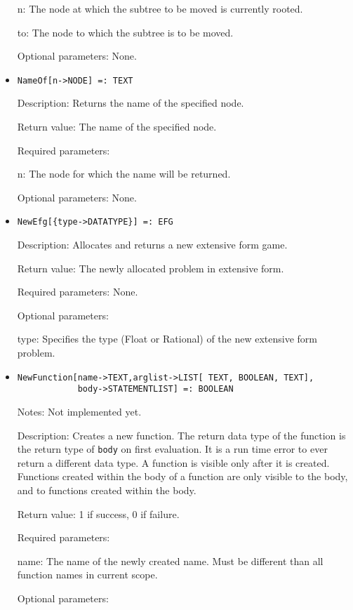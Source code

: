 \begin{itemize}
\bd
\item
[n:] The node at which the subtree to be moved is currently rooted.
\item
[to:] The node to which the subtree is to be moved.
\ed

\item
[Optional parameters:] None.
\ed

\item
\protect \large \begin{verbatim}
NameOf[n->NODE] =: TEXT
\end{verbatim}\normalsize

\bd
\item
[Description:] Returns the name of the specified node.
\item
[Return value:] The name of the specified node.
\item
[Required parameters:]\hfil\null

\bd
\item
[n:] The node for which the name will be returned.
\ed

\item
[Optional parameters:] None.
\ed

\item
\protect \large \begin{verbatim}
NewEfg[{type->DATATYPE}] =: EFG
\end{verbatim}\normalsize

\bd
\item
[Description:] Allocates and returns a new extensive form game.
\item
[Return value:] The newly allocated problem in extensive form.
\item
[Required parameters:] None.
\item
[Optional parameters:]\hfil\null

\bd
\item
[type:] Specifies the type (Float or Rational) of the new extensive
form problem.
\ed
\ed

\item
\protect \large \begin{verbatim}
NewFunction[name->TEXT,arglist->LIST[ TEXT, BOOLEAN, TEXT], 
            body->STATEMENTLIST] =: BOOLEAN
\end{verbatim}\normalsize

\bd
\item [Notes:] Not implemented yet.  
\item
[Description:] Creates a new function.  The return data type of the
function is the return type of \verb+body+ on first evaluation.  It is
a run time error to ever return a different data type.  A function is
visible only after it is created.  Functions created within the body
of a function are only visible to the body, and to functions created
within the body.
\item
[Return value:] 1 if success, 0 if failure.  
\item
[Required parameters:]
\bd
\item[name:] The name of the newly created name.  Must be different
than all function names in current scope.  
\ed
\item
[Optional parameters:]\hfil\null


\end{itemize}
